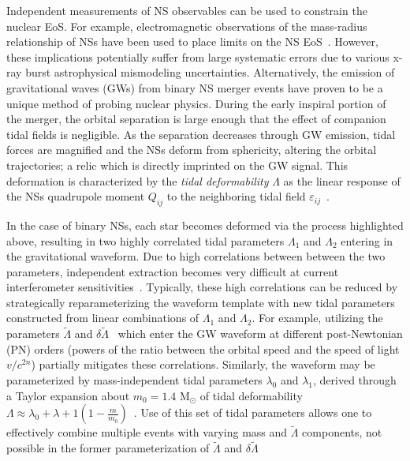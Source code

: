 \documentclass[prd,twocolumn,nofootinbib,superscriptaddress,amsmath,amssymb]{revtex4-1}
\begin{document}
Independent measurements of NS observables can be used to constrain the nuclear EoS.
For example, electromagnetic observations of the mass-radius relationship of NSs have been used to place limits on the NS EoS~\cite{guver,ozel-baym-guver,steiner-lattimer-brown,Lattimer2014,Ozel:2016oaf}.
However, these implications potentially suffer from large systematic errors due to various x-ray burst astrophysical mismodeling uncertainties.
Alternatively, the emission of gravitational waves (GWs) from binary NS merger events have proven to be a unique method of probing nuclear physics.
During the early inspiral portion of the merger, the orbital separation is large enough that the effect of companion tidal fields is negligible. 
As the separation decreases through GW emission, tidal forces are magnified and the NSs deform from sphericity, altering the orbital trajectories; a relic which is directly imprinted on the GW signal.
This deformation is characterized by the \textit{tidal deformability} $\Lambda$ as the linear response of the NSs quadrupole moment $Q_{ij}$ to the neighboring tidal field $\varepsilon_{ij}$~\cite{hinderer-love,Flanagan2008}.

In the case of binary NSs, each star becomes deformed via the process highlighted above, resulting in two highly correlated tidal parameters $\Lambda_1$ and $\Lambda_2$ entering in the gravitational waveform\cite{Flanagan2008,Vines:2011ud}.
Due to high correlations between between the two parameters, independent extraction becomes very difficult at current interferometer sensitivities~\cite{Wade:tidalCorrections}.
Typically, these high correlations can be reduced by strategically reparameterizing the waveform template with new tidal parameters constructed from linear combinations of $\Lambda_1$ and $\Lambda_2$.
For example, utilizing the parameters $\tilde{\Lambda}$ and $\delta \tilde{\Lambda}$~\cite{Favata:2013rwa,Wade:tidalCorrections} which enter the GW waveform at different post-Newtonian (PN) orders (powers of the ratio between the orbital speed and the speed of light $v/c^{2n}$) partially mitigates these correlations.
Similarly, the waveform may be parameterized by mass-independent tidal parameters $\lambda_0$ and $\lambda_1$, derived through a Taylor expansion about $m_0=1.4 \text{ M}_{\odot}$ of tidal deformability $\Lambda \approx \lambda_0+\lambda+1(1-\frac{m}{m_0})$~\cite{delPozzo:TaylorTidal,Yagi:binLove}. 
Use of this set of tidal parameters allows one to effectively combine multiple events with varying mass and $\tilde\Lambda$ components, not possible in the former parameterization of $\tilde{\Lambda}$ and $\delta \tilde{\Lambda}$
\end{document}
